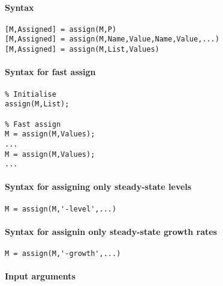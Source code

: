 


	\paragraph{Syntax}

\begin{verbatim}
[M,Assigned] = assign(M,P)
[M,Assigned] = assign(M,Name,Value,Name,Value,...)
[M,Assigned] = assign(M,List,Values)
\end{verbatim}

\paragraph{Syntax for fast assign}

\begin{verbatim}
% Initialise
assign(M,List);

% Fast assign
M = assign(M,Values);
...
M = assign(M,Values);
...
\end{verbatim}

\paragraph{Syntax for assigning only steady-state
levels}

\begin{verbatim}
M = assign(M,'-level',...)
\end{verbatim}

\paragraph{Syntax for assignin only steady-state growth
rates}

\begin{verbatim}
M = assign(M,'-growth',...)
\end{verbatim}

\paragraph{Input arguments}

